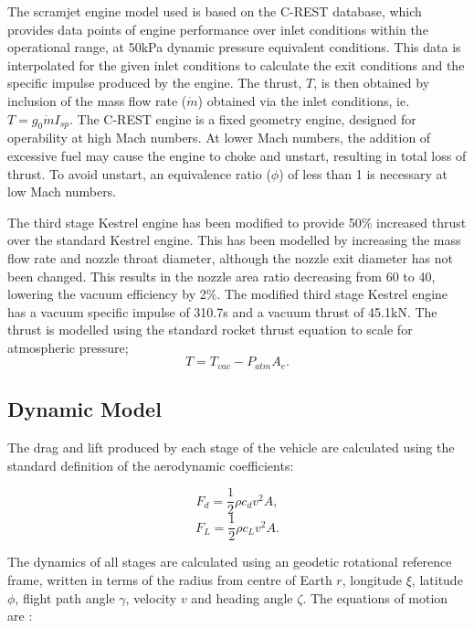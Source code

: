 \documentclass[]{aiaa-tc}
\begin{document}
The scramjet engine model used is based on the C-REST database\cite{Preller2017}, which provides data points of engine performance over inlet conditions within the operational range, at 50kPa dynamic pressure equivalent conditions. This data is interpolated for the given inlet conditions to calculate the exit conditions and the specific impulse produced by the engine. The thrust, $T$, is then obtained by inclusion of the mass flow rate ($\dot{m}$) obtained via the inlet conditions, ie. $T = g_0\dot{m}I_{sp}$.
The C-REST engine is a fixed geometry engine, designed for operability at high Mach numbers. At lower Mach numbers, the addition of excessive fuel may cause the engine to choke and unstart, resulting in total loss of thrust. To avoid unstart, an equivalence ratio ($\phi$) of less than 1 is necessary at low Mach numbers. 

 The third stage Kestrel engine has been modified to provide 50\% increased thrust over the standard Kestrel engine. This has been modelled by increasing the mass flow rate and nozzle throat diameter, although the nozzle exit diameter has not been changed. This results in the nozzle area ratio decreasing from 60\cite{Vehicle2008} to 40, lowering the vacuum efficiency by 2\%\cite{RPE}. The modified third stage Kestrel engine has a vacuum specific impulse of 310.7s\cite{Vehicle2008} and a vacuum thrust of 45.1kN. The thrust is modelled using the standard rocket thrust equation to scale for atmospheric pressure; 
\begin{equation}
T = T_{vac} -P_{atm} A_e.
\end{equation}

\subsection{Dynamic Model}
The drag and lift produced by each stage of the vehicle are calculated using the standard definition of the aerodynamic coefficients:

\begin{equation}
F_d = \frac{1}{2}\rho c_d v^2 A ,
\end{equation}
\begin{equation}
F_L = \frac{1}{2}\rho c_L v^2 A .
\end{equation}

The dynamics of all stages are calculated using an geodetic rotational reference frame, written in terms of the radius from centre of Earth $r$, longitude $\xi$, latitude $\phi$, flight path angle $\gamma$, velocity $v$ and heading angle $\zeta$. The equations of motion are \cite{Josselyn2002a}:
\end{document}
